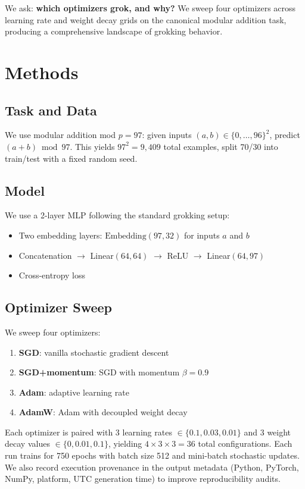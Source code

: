 \documentclass[11pt,a4paper]{article}
\begin{document}
We ask: \textbf{which optimizers grok, and why?} We sweep four optimizers across learning rate and weight decay grids on the canonical modular addition task, producing a comprehensive landscape of grokking behavior.

\section{Methods}

\subsection{Task and Data}

We use modular addition mod $p = 97$: given inputs $(a, b) \in \{0, \ldots, 96\}^2$, predict $(a + b) \bmod 97$. This yields $97^2 = 9{,}409$ total examples, split 70/30 into train/test with a fixed random seed.

\subsection{Model}

We use a 2-layer MLP following the standard grokking setup:
\begin{itemize}
    \item Two embedding layers: $\text{Embedding}(97, 32)$ for inputs $a$ and $b$
    \item Concatenation $\to$ Linear$(64, 64)$ $\to$ ReLU $\to$ Linear$(64, 97)$
    \item Cross-entropy loss
\end{itemize}

\subsection{Optimizer Sweep}

We sweep four optimizers:
\begin{enumerate}
    \item \textbf{SGD}: vanilla stochastic gradient descent
    \item \textbf{SGD+momentum}: SGD with momentum $\beta = 0.9$
    \item \textbf{Adam}: adaptive learning rate \citep{kingma2015adam}
    \item \textbf{AdamW}: Adam with decoupled weight decay \citep{loshchilov2019decoupled}
\end{enumerate}

Each optimizer is paired with 3 learning rates $\in \{0.1, 0.03, 0.01\}$ and 3 weight decay values $\in \{0, 0.01, 0.1\}$, yielding $4 \times 3 \times 3 = 36$ total configurations. Each run trains for 750 epochs with batch size 512 and mini-batch stochastic updates. We also record execution provenance in the output metadata (Python, PyTorch, NumPy, platform, UTC generation time) to improve reproducibility audits.
\end{document}
